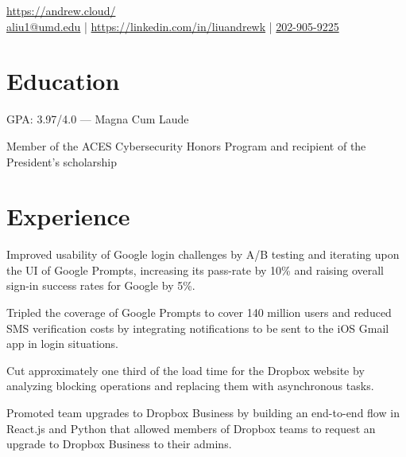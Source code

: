 \documentclass[]{template}
\begin{document}
\lastupdated

{
  \url{https://andrew.cloud/} \\
  \href{mailto:aliu1@umd.edu}{aliu1@umd.edu} | \href{https://linkedin.com/in/liuandrewk}{https://linkedin.com/in/liuandrewk} |
  \href{tel:2029059225}{202-905-9225}
}

\section{Education}
\begin{tightemize}
\item GPA: 3.97/4.0 --- Magna Cum Laude
\item Member of the ACES Cybersecurity Honors Program and recipient of the President's scholarship
\end{tightemize}
\sectionsep

\section{Experience}

\begin{tightemize}
\item Improved usability of Google login challenges by A/B testing and iterating upon the UI of Google Prompts, increasing its pass-rate by 10\% and raising overall sign-in success rates for Google by 5\%.
\item Tripled the coverage of Google Prompts to cover 140 million users and reduced SMS verification costs by integrating notifications to be sent to the iOS Gmail app in login situations.
\end{tightemize}
\sectionsep

\begin{tightemize}
\item Cut approximately one third of the load time for the Dropbox website by analyzing blocking operations and replacing them with asynchronous tasks.
\item Promoted team upgrades to Dropbox Business by building an end-to-end flow in React.js and Python that allowed members of Dropbox teams to request an upgrade to Dropbox Business to their admins.
\end{tightemize}
\sectionsep
\end{document}
